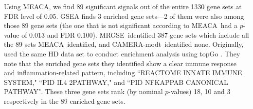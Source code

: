 \documentclass[a4,center,fleqn]{NAR}
\newcommand{\OurMethod}{MEACA}
\newcommand{\CMT}{CAMERA-modt}
\newcommand{\genr}{MRGSE}
\begin{document}
	Using \OurMethod, we find 89 significant signals out of the entire 1330 gene sets at FDR level
	of 0.05. GSEA finds 3 enriched gene sets---2 of them were also among those 89 gene sets (the one
	that is not significant according to \OurMethod~had a $p$-value of 0.013 and FDR 0.100).
	\genr~identified 387 gene sets which include all the 89 sets \OurMethod~identified, and 
	\CMT~identified none. Originally, \citet{labadorf2015rna} used the same HD data set to conduct 
	enrichment analysis using topGo \citep{alexa2010topgo}. They note that the enriched gene sets 
	they identified show a clear immune response and inflammation-related pattern, including 
	``REACTOME INNATE IMMUNE SYSTEM," ``PID IL4
	2PATHWAY," and ``PID NFKAPPAB CANONICAL PATHWAY". These three gene sets rank (by nominal
	$p$-values) 18, 10 and 3 respectively in the 89 enriched gene sets.
	
\end{document}
